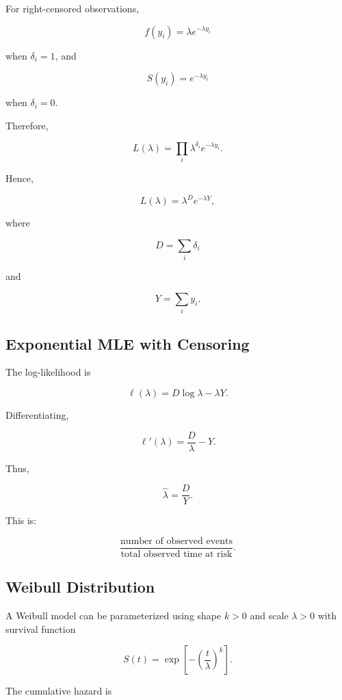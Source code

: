For right-censored observations,

\[
f(y_i)
=
\lambda e^{-\lambda y_i}
\]

when \(\delta_i=1\), and

\[
S(y_i)
=
e^{-\lambda y_i}
\]

when \(\delta_i=0\).

Therefore,

\[
L(\lambda)
=
\prod_i
\lambda^{\delta_i}
e^{-\lambda y_i}.
\]

Hence,

\[
\boxed{
L(\lambda)
=
\lambda^D
e^{-\lambda Y},
}
\]

where

\[
D
=
\sum_i\delta_i
\]

and

\[
Y
=
\sum_iy_i.
\]

\subsection{Exponential MLE with Censoring}
\label{subsec:exponential-mle-censoring}

The log-likelihood is

\[
\ell(\lambda)
=
D\log\lambda
-
\lambda Y.
\]

Differentiating,

\[
\ell'(\lambda)
=
\frac{D}{\lambda}
-
Y.
\]

Thus,

\[
\boxed{
\widehat{\lambda}
=
\frac{
D
}{
Y
}.
}
\]

This is:

\[
\boxed{
\frac{
\text{number of observed events}
}{
\text{total observed time at risk}
}.
}
\]

\subsection{Weibull Distribution}
\label{subsec:weibull-survival}

A Weibull model can be parameterized using shape \(k>0\) and scale
\(\lambda>0\) with survival function

\[
\boxed{
S(t)
=
\exp
\left[
-
\left(
\frac{t}{\lambda}
\right)^k
\right].
}
\]

The cumulative hazard is

